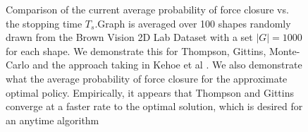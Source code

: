 \documentclass[a4paper, 10pt, conference]{ieeeconf}      %
\begin{document}
  
   

\begin{figure}%
    \centering

    \caption{Comparison of the current average probability of force closure vs. the stopping time $T_s$.Graph is averaged over 100 shapes randomly drawn from the Brown Vision 2D Lab Dataset \cite{brown} with a set $|G|=1000$ for each shape.  We demonstrate this for Thompson, Gittins, Monte-Carlo and the approach taking in Kehoe et al \cite{kehoe2012toward}. We also demonstrate what the average probability of force closure for the approximate optimal policy. Empirically, it appears that Thompson and Gittins converge at a faster rate to the optimal solution, which is desired for an anytime algorithm  }%
    \label{fig:motivation}%
\end{figure}
\end{document}
